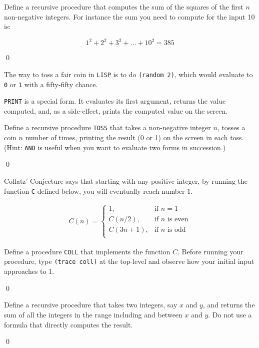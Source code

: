 \documentclass[a4paper,11pt]{article}
\begin{document}
\begin{uexercise}
Define a recursive procedure that computes the sum of the squares of the first $n$ non-negative integers. For instance the sum you need to compute for the input 10 is:

$$
1^2 + 2^2 + 3^2 + \ldots + 10^2 = 385
$$

\qed
\end{uexercise}

\begin{uexercise}
The way to toss a fair coin in \Verb+LISP+ is to do \Verb+(random 2)+, which would evaluate to \Verb+0+ or \Verb+1+ with a fifty-fifty chance.

\Verb+PRINT+ is a special form. It evaluates its first argument, returns the value computed, and, as a side-effect, prints the computed value on the screen.

Define a recursive procedure \Verb+TOSS+ that takes a non-negative integer $n$, tosses a coin $n$ number of times, printing the result (0 or 1) on the screen in each toss. (Hint: \Verb+AND+ is useful when you want to evaluate two forms in succession.)

\qed
\end{uexercise}

\begin{uexercise}
\label{collatzdef}

Collatz' Conjecture says that starting with any positive integer, by running the function \Verb+C+ defined below, you will eventually reach number 1.

\begin{align}
C(n) =  
\begin{cases}
1, & \text{if } n = 1 \\
C(n/2), & \text{if }n\text{ is even}\\ 
C(3n+1), & \text{if }n\text{ is odd}\\ 
\end{cases}
\end{align}

Define a procedure \Verb+COLL+ that implements the function $C$. Before running your procedure, type \Verb+(trace coll)+ at the top-level and observe how your initial input approaches to 1. 

\qed
\end{uexercise}


\begin{uexercise}
Define a recursive procedure that takes two integers, say $x$ and $y$, and returns the sum of all the integers in the range including and between $x$ and $y$. Do not use a formula that directly computes the result.

\qed
\end{uexercise}
\end{document}
